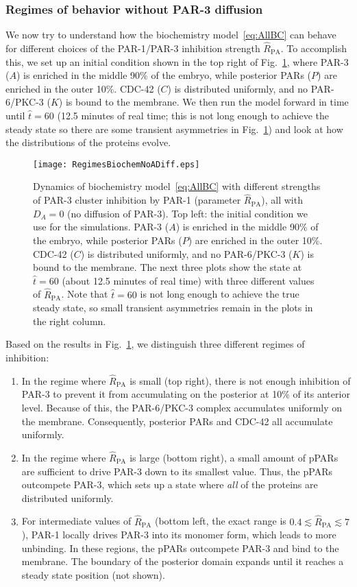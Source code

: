 \documentclass[11pt]{article}
\newcommand{\6}[1]{#1_{\text{6}}}
\newcommand{\3}[1]{#1_{\text{3}}}
\begin{document}
\subsubsection{Regimes of behavior without PAR-3 diffusion}
We now try to understand how the biochemistry model\ \eqref{eq:AllBC} can behave for different choices of the PAR-1/PAR-3 inhibition strength $\hat R_\text{PA}$. To accomplish this, we set up an initial condition shown in the top right of Fig.\ \ref{fig:BCRegimes}, where PAR-3 ($A$) is enriched in the middle 90\% of the embryo, while posterior PARs ($P$) are enriched in the outer 10\%. CDC-42 ($C$) is distributed uniformly, and no PAR-6/PKC-3 ($K$) is bound to the membrane. We then run the model forward in time until $\hat t = 60$ (12.5 minutes of real time; this is not long enough to achieve the steady state so there are some transient asymmetries in Fig.\ \ref{fig:BCRegimes}) and look at how the distributions of the proteins evolve. 

\begin{figure}
\centering
\texttt{[image: RegimesBiochemNoADiff.eps]}
\caption{\label{fig:BCRegimes}Dynamics of biochemistry model\ \eqref{eq:AllBC} with different strengths of PAR-3 cluster inhibition by PAR-1 (parameter $\hat R_\text{PA}$), all with $D_A=0$ (no diffusion of PAR-3). Top left: the initial condition we use for the simulations. PAR-3 ($A$) is enriched in the middle 90\% of the embryo, while posterior PARs ($P$) are enriched in the outer 10\%. CDC-42 ($C$) is distributed uniformly, and no PAR-6/PKC-3 ($K$) is bound to the membrane. The next three plots show the state at $\hat t = 60$ (about 12.5 minutes of real time) with three different values of $\hat R_\text{PA}$. Note that $\hat t = 60$ is not long enough to achieve the true steady state, so small transient asymmetries remain in the plots in the right column.}
\end{figure}

Based on the results in Fig.\ \ref{fig:BCRegimes}, we distinguish three different regimes of inhibition:
\begin{enumerate}
\item In the regime where $\hat R_\text{PA}$ is small (top right), there is not enough inhibition of PAR-3 to prevent it from accumulating on the posterior at 10\% of its anterior level. Because of this, the PAR-6/PKC-3 complex accumulates uniformly on the membrane. Consequently, posterior PARs and CDC-42 all accumulate uniformly. 
\item In the regime where $\hat R_\text{PA}$ is large (bottom right), a small amount of pPARs are sufficient to drive PAR-3 down to its smallest value. Thus, the pPARs outcompete PAR-3, which sets up a state where \emph{all} of the proteins are distributed uniformly. 
\item For intermediate values of $\hat R_\text{PA}$ (bottom left, the exact range is $0.4 \lesssim \hat R_\text{PA} \lesssim 7$), PAR-1 locally drives PAR-3 into its monomer form, which leads to more unbinding. In these regions, the pPARs outcompete PAR-3 and bind to the membrane. The boundary of the posterior domain expands until it reaches a steady state position (not shown). 
\end{enumerate}
\end{document}
